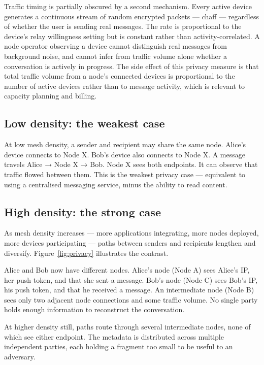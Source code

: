 \documentclass[11pt, a4paper]{article}
\begin{document}
Traffic timing is partially obscured by a second mechanism. Every active device generates a continuous stream of random encrypted packets — chaff — regardless of whether the user is sending real messages. The rate is proportional to the device's relay willingness setting but is constant rather than activity-correlated. A node operator observing a device cannot distinguish real messages from background noise, and cannot infer from traffic volume alone whether a conversation is actively in progress. The side effect of this privacy measure is that total traffic volume from a node's connected devices is proportional to the number of active devices rather than to message activity, which is relevant to capacity planning and billing.

\subsection{Low density: the weakest case}

At low mesh density, a sender and recipient may share the same node. Alice's device connects to Node X. Bob's device also connects to Node X. A message travels Alice → Node X → Bob. Node X sees both endpoints. It can observe that traffic flowed between them. This is the weakest privacy case — equivalent to using a centralised messaging service, minus the ability to read content.

\subsection{High density: the strong case}

As mesh density increases — more applications integrating, more nodes deployed, more devices participating — paths between senders and recipients lengthen and diversify. Figure~\ref{fig:privacy} illustrates the contrast.

Alice and Bob now have different nodes. Alice's node (Node A) sees Alice's IP, her push token, and that she sent a message. Bob's node (Node C) sees Bob's IP, his push token, and that he received a message. An intermediate node (Node B) sees only two adjacent node connections and some traffic volume. No single party holds enough information to reconstruct the conversation.

At higher density still, paths route through several intermediate nodes, none of which see either endpoint. The metadata is distributed across multiple independent parties, each holding a fragment too small to be useful to an adversary.
\end{document}
